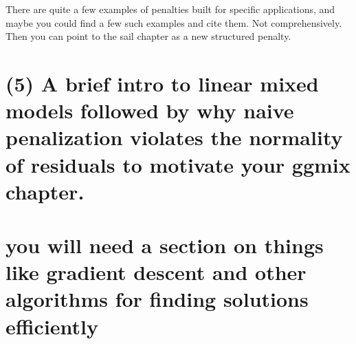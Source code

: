 \documentclass[12pt,letterpaper]{article}
\begin{document}
There are quite a few examples of penalties built for specific applications, and maybe you could find a few such examples and cite them. Not comprehensively.  Then you can point to the sail chapter as a new structured penalty.


\section{(5) A brief intro to linear mixed models followed by why naive penalization violates the normality of residuals to motivate your ggmix chapter.}



\section{you will need a section on things like gradient descent and other algorithms for finding solutions efficiently}
\end{document}

